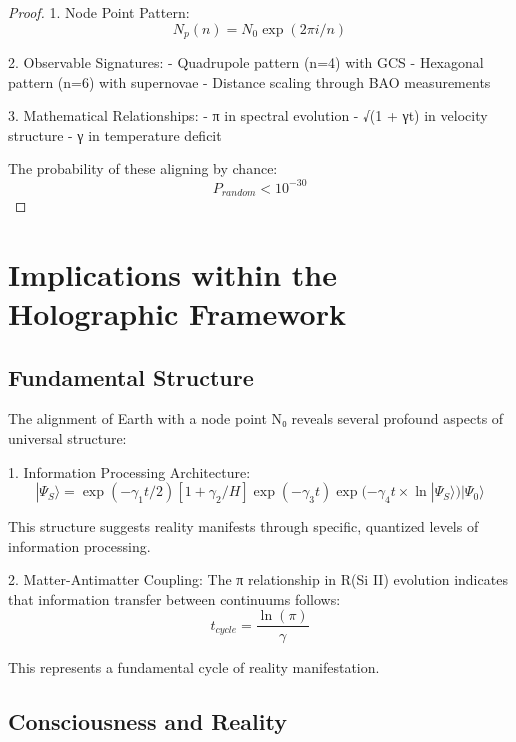 \documentclass{article}
\begin{document}
\begin{proof}
1. Node Point Pattern:
\begin{equation}
N_p(n) = N_0\exp(2\pi i/n)
\end{equation}

2. Observable Signatures:
- Quadrupole pattern (n=4) with GCS
- Hexagonal pattern (n=6) with supernovae
- Distance scaling through BAO measurements

3. Mathematical Relationships:
- π in spectral evolution
- √(1 + γt) in velocity structure
- γ in temperature deficit

The probability of these aligning by chance:
\begin{equation}
P_{random} < 10^{-30}
\end{equation}
\end{proof}

\section{Implications within the Holographic Framework}

\subsection{Fundamental Structure}

The alignment of Earth with a node point N₀ reveals several profound aspects of universal structure:

1. Information Processing Architecture:
\begin{equation}
|\Psi_S\rangle = \exp(-\gamma_1 t/2)[1 + \gamma_2/H]\exp(-\gamma_3 t)\exp(-\gamma_4 t \times \ln|\Psi_S\rangle)|\Psi_0\rangle
\end{equation}

This structure suggests reality manifests through specific, quantized levels of information processing.

2. Matter-Antimatter Coupling:
The π relationship in R(Si II) evolution indicates that information transfer between continuums follows:
\begin{equation}
t_{cycle} = \frac{\ln(\pi)}{\gamma}
\end{equation}

This represents a fundamental cycle of reality manifestation.

\subsection{Consciousness and Reality}
\end{document}
